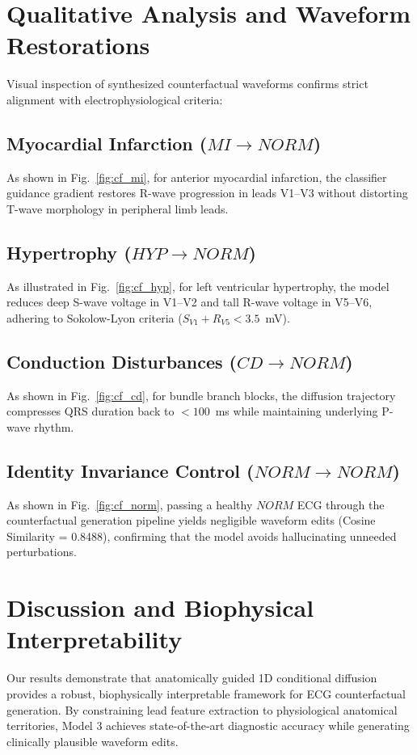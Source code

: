 \documentclass[5p,twocolumn,10pt]{elsarticle}
\begin{document}
\section{Qualitative Analysis and Waveform Restorations}
\label{sec:qualitative}

Visual inspection of synthesized counterfactual waveforms confirms strict alignment with electrophysiological criteria:

\subsection{Myocardial Infarction ($MI \to NORM$)}
As shown in Fig.~\ref{fig:cf_mi}, for anterior myocardial infarction, the classifier guidance gradient restores R-wave progression in leads V1--V3 without distorting T-wave morphology in peripheral limb leads.

\subsection{Hypertrophy ($HYP \to NORM$)}
As illustrated in Fig.~\ref{fig:cf_hyp}, for left ventricular hypertrophy, the model reduces deep S-wave voltage in V1--V2 and tall R-wave voltage in V5--V6, adhering to Sokolow-Lyon criteria ($S_{V1} + R_{V5} < 3.5$~mV).

\subsection{Conduction Disturbances ($CD \to NORM$)}
As shown in Fig.~\ref{fig:cf_cd}, for bundle branch blocks, the diffusion trajectory compresses QRS duration back to $< 100$~ms while maintaining underlying P-wave rhythm.

\subsection{Identity Invariance Control ($NORM \to NORM$)}
As shown in Fig.~\ref{fig:cf_norm}, passing a healthy $NORM$ ECG through the counterfactual generation pipeline yields negligible waveform edits (Cosine Similarity = 0.8488), confirming that the model avoids hallucinating unneeded perturbations.

\section{Discussion and Biophysical Interpretability}
\label{sec:discussion}

Our results demonstrate that anatomically guided 1D conditional diffusion provides a robust, biophysically interpretable framework for ECG counterfactual generation. By constraining lead feature extraction to physiological anatomical territories, Model 3 achieves state-of-the-art diagnostic accuracy while generating clinically plausible waveform edits.
\end{document}

